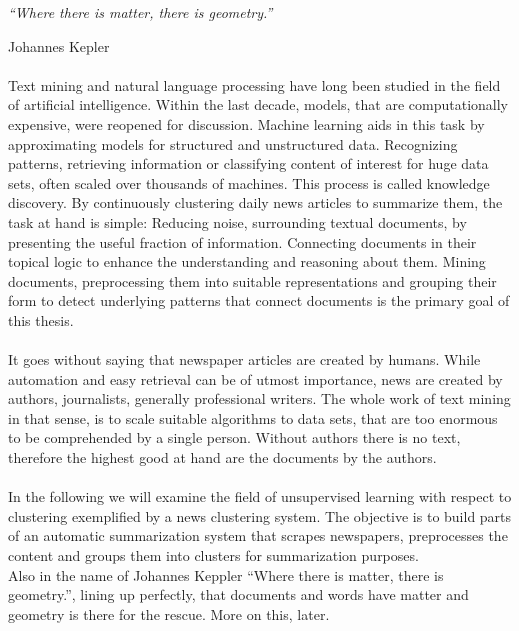 \epigraph{\emph{
  ``Where there is matter, there is geometry.''
}}{ Johannes Kepler }

\paragraph{} Text mining and natural language processing have long been studied in the field of artificial intelligence. Within the last decade, models, that are computationally expensive, were reopened for discussion. Machine learning aids in this task by approximating models for structured and unstructured data. Recognizing patterns, retrieving information or classifying content of interest for huge data sets, often scaled over thousands of machines. This process is called knowledge discovery. By continuously clustering daily news articles to summarize them, the task at hand is simple: Reducing noise, surrounding textual documents, by presenting the useful fraction of information. Connecting documents in their topical logic to enhance the understanding and reasoning about them. Mining documents, preprocessing them into suitable representations and grouping their form to detect underlying patterns that connect documents is the primary goal of this thesis.

\paragraph{} It goes without saying that newspaper articles are created by humans. While automation and easy retrieval can be of utmost importance, news are created by authors, journalists, generally professional writers. The whole work of text mining in that sense, is to scale suitable algorithms to data sets, that are too enormous to be comprehended by a single person. Without authors there is no text, therefore the highest good at hand are the documents by the authors.

\paragraph{} In the following we will examine the field of unsupervised learning with respect to clustering exemplified by a news clustering system. The objective is to build parts of an automatic summarization system that scrapes newspapers, preprocesses the content and groups them into clusters for summarization purposes.\\
Also in the name of Johannes Keppler ``Where there is matter, there is geometry.'', lining up perfectly, that documents and words have matter and geometry is there for the rescue. More on this, later.

